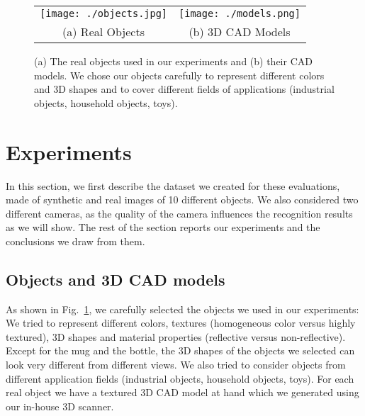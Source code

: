 \documentclass[10pt,twocolumn,letterpaper]{article}
\begin{document}

\begin{figure}
\begin{center}
\begin{tabular}{cc}
\texttt{[image: ./objects.jpg]} &
\texttt{[image: ./models.png]} \\
(a) Real Objects &
(b) 3D CAD Models \\
\end{tabular}
\end{center}
\caption{\label{fig:models} (a) The real objects used in our experiments and
(b)  their CAD  models.  We chose  our  objects
  carefully to represent  different colors and 3D shapes and  to cover different
  fields of applications (industrial objects, household objects, toys). }
\end{figure}

\section{Experiments}
\label{sec:epxeriments}


In this section, we first describe the dataset we created for these evaluations,
made of synthetic  and real images of 10 different  objects.  We also considered
two different cameras,  as the quality of the camera  influences the recognition
results as we  will show.  The rest  of the section reports  our experiments and
the conclusions we draw from them.


\subsection{Objects and 3D CAD models}
\label{lab:objects}

As shown in Fig.~\ref{fig:models}, we carefully  selected the objects we used in
our experiments: We  tried to represent different  colors, textures (homogeneous
color versus  highly textured),  3D shapes  and material  properties (reflective
versus non-reflective).  Except for the mug and the bottle, the 3D shapes of the
objects we selected can look very different from different views.  We also tried
to  consider  objects from  different  application  fields (industrial  objects,
household objects, toys).  For each real object  we have a textured 3D CAD model
at hand which we generated using our in-house 3D scanner.
\end{document}
